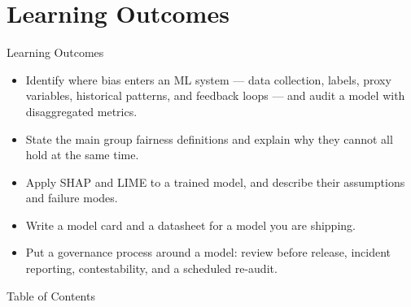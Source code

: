 \section{Learning Outcomes}

\begin{frame}{Learning Outcomes}
    \begin{itemize}
        \setlength\itemsep{0.7em}
        \item Identify where bias enters an ML system --- data collection, labels, proxy variables, historical patterns, and feedback loops --- and audit a model with disaggregated metrics.

        \item State the main group fairness definitions and explain why they cannot all hold at the same time.

        \item Apply SHAP and LIME to a trained model, and describe their assumptions and failure modes.

        \item Write a model card and a datasheet for a model you are shipping.

        \item Put a governance process around a model: review before release, incident reporting, contestability, and a scheduled re-audit.
    \end{itemize}
\end{frame}

\begin{frame}[allowframebreaks]{Table of Contents}
    \tableofcontents
\end{frame}
